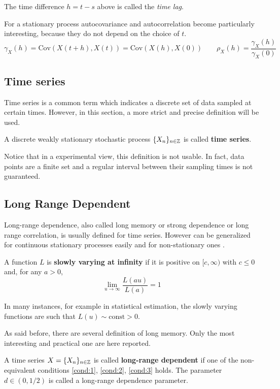 The time difference $h = t - s$ above is called the \emph{time lag}.

For a stationary process autocovariance and autocorrelation become particularly interesting, because they do not depend on the choice of $t$.
\begin{equation}
	\gamma_X(h) = \text{Cov}(X(t+h), X(t)) = \text{Cov}(X(h), X(0)) \qquad \rho_X(h) = \frac{\gamma_X(h)}{\gamma_X(0)}
\end{equation}
\subsection{Time series}
Time series is a common term which indicates a discrete set of data sampled at certain times. However, in this section, a more strict and precise definition will be used.
\begin{definition}
	A discrete weakly stationary stochastic process $\{X_n\}_{n \in \mathbb{Z}}$ is called \textbf{time series}.
\end{definition}

Notice that in a experimental view, this definition is not usable. In fact, data points are a finite set and a regular interval between their sampling times is not guaranteed.

\subsection{Long Range Dependent}
Long-range dependence, also called long memory or strong dependence or long range correlation, is usually defined for time series. However can be generalized for continuous stationary processes easily \cite{pipiras_taqqu_2017} and for non-stationary ones \cite{Movahed_2006}.

\begin{definition}
	A function $L$ is \textbf{slowly varying at infinity} if it is positive on $[c, \infty)$ with $c \le 0$ and, for any $a > 0$,
	\begin{equation}
		\lim_{u \to \infty} \frac{L(au)}{L(a)} = 1
	\end{equation}
\end{definition}

In many instances, for example in statistical estimation, the slowly varying
functions are such that $L(u) \sim \text{const} > 0$. 

As said before, there are several definition of long memory. Only the most interesting and practical one are here reported.
\begin{definition}
	A time series $X = \{ X_n \}_{n \in \mathbb{Z}}$ is called \textbf{long-range dependent} if one of the non-equivalent conditions \autoref{cond:1}, \autoref{cond:2}, \autoref{cond:3} holds. The parameter $d \in (0, 1/2)$ is called a \textnormal{long-range dependence parameter}.
\end{definition}

